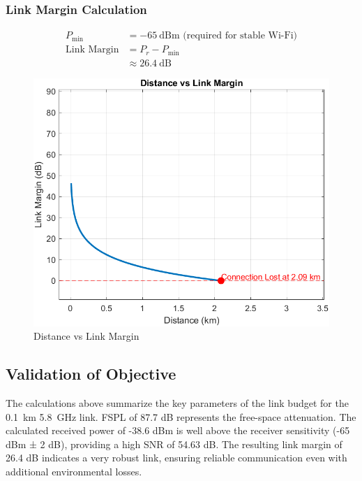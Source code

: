 \documentclass[letterpaper, 10 pt, conference]{ieeeconf}  %
\begin{document}
\subsubsection{Link Margin Calculation}
\begin{align*}
P_{\min} &= -65\ \text{dBm (required for stable Wi-Fi)} \\
\text{Link Margin} &= P_r - P_{\min} \\
&\approx 26.4\ \text{dB}
\end{align*}

\begin{figure}[htbp]
    \centering
    \includegraphics[width=0.75\linewidth]{figures/lm.png}
    \caption{Distance vs Link Margin}
    \label{fig:placeholder}
\end{figure}

\subsection{Validation of Objective}



The calculations above summarize the key parameters of the link budget for the 0.1~km 5.8~GHz link. FSPL of 87.7 dB represents the free-space attenuation. The calculated received power of -38.6 dBm is well above the receiver sensitivity (-65 dBm ± 2 dB), providing a high SNR of 54.63 dB. The resulting link margin of 26.4 dB indicates a very robust link, ensuring reliable communication even with additional environmental losses.
\end{document}
